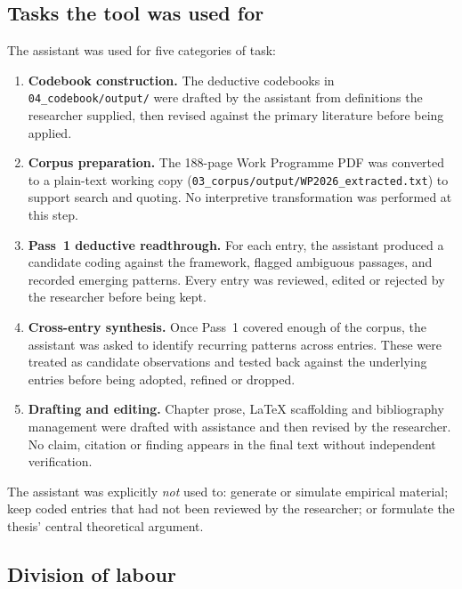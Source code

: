 \subsection{Tasks the tool was used for}
\label{sec:meth-genai-tasks}

The assistant was used for five categories of task:

\begin{enumerate}[leftmargin=*]
  \item \textbf{Codebook construction.} The deductive codebooks in
        \texttt{04\_codebook/output/} were drafted by the assistant from
        definitions the researcher supplied, then revised against the
        primary literature before being applied.
  \item \textbf{Corpus preparation.} The 188-page Work Programme PDF
        was converted to a plain-text working copy
        (\texttt{03\_corpus/output/WP2026\_extracted.txt}) to support
        search and quoting. No interpretive transformation was
        performed at this step.
  \item \textbf{Pass~1 deductive readthrough.} For each entry, the
        assistant produced a candidate coding against the framework,
        flagged ambiguous passages, and recorded emerging patterns.
        Every entry was reviewed, edited or rejected by the researcher
        before being kept.
  \item \textbf{Cross-entry synthesis.} Once Pass~1 covered enough of
        the corpus, the assistant was asked to identify recurring
        patterns across entries. These were treated as candidate
        observations and tested back against the underlying entries
        before being adopted, refined or dropped.
  \item \textbf{Drafting and editing.} Chapter prose, LaTeX scaffolding
        and bibliography management were drafted with assistance and
        then revised by the researcher. No claim, citation or finding
        appears in the final text without independent verification.
\end{enumerate}

The assistant was explicitly \emph{not} used to: generate or simulate
empirical material; keep coded entries that had not been reviewed by
the researcher; or formulate the thesis' central theoretical argument.

\subsection{Division of labour}
\label{sec:meth-genai-labour}

